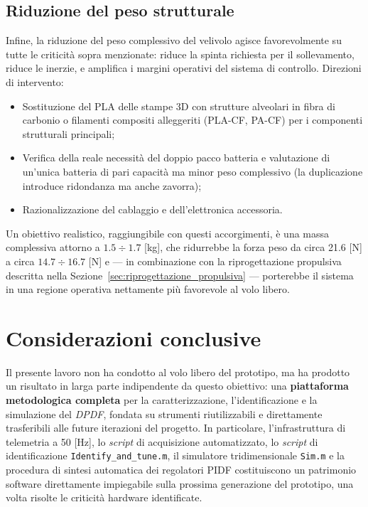 \documentclass[11pt]{report}
\begin{document}
	\subsection{Riduzione del peso strutturale}
	\label{sec:riduzione_peso}
	Infine, la riduzione del peso complessivo del velivolo agisce favorevolmente su tutte le criticità sopra menzionate: riduce la spinta richiesta per il sollevamento, riduce le inerzie, e amplifica i margini operativi del sistema di controllo. Direzioni di intervento:
	\begin{itemize}
		\item Sostituzione del PLA delle stampe 3D con strutture alveolari in fibra di carbonio o filamenti compositi alleggeriti (PLA-CF, PA-CF) per i componenti strutturali principali;
		\item Verifica della reale necessità del doppio pacco batteria e valutazione di un'unica batteria di pari capacità ma minor peso complessivo (la duplicazione introduce ridondanza ma anche zavorra);
		\item Razionalizzazione del cablaggio e dell'elettronica accessoria.
	\end{itemize}
	Un obiettivo realistico, raggiungibile con questi accorgimenti, è una massa complessiva attorno a $1.5 \div 1.7$ [kg], che ridurrebbe la forza peso da circa 21.6 [N] a circa $14.7 \div 16.7$ [N] e --- in combinazione con la riprogettazione propulsiva descritta nella Sezione~\ref{sec:riprogettazione_propulsiva} --- porterebbe il sistema in una regione operativa nettamente più favorevole al volo libero.
	
	\section{Considerazioni conclusive}
	\label{sec:considerazioni_finali}
	
	Il presente lavoro non ha condotto al volo libero del prototipo, ma ha prodotto un risultato in larga parte indipendente da questo obiettivo: una \textbf{piattaforma metodologica completa} per la caratterizzazione, l'identificazione e la simulazione del \textit{DPDF}, fondata su strumenti riutilizzabili e direttamente trasferibili alle future iterazioni del progetto. In particolare, l'infrastruttura di telemetria a 50 [Hz], lo \textit{script} di acquisizione automatizzato, lo \textit{script} di identificazione \texttt{Identify\_and\_tune.m}, il simulatore tridimensionale \texttt{Sim.m} e la procedura di sintesi automatica dei regolatori PIDF costituiscono un patrimonio software direttamente impiegabile sulla prossima generazione del prototipo, una volta risolte le criticità hardware identificate.
	
\end{document}
